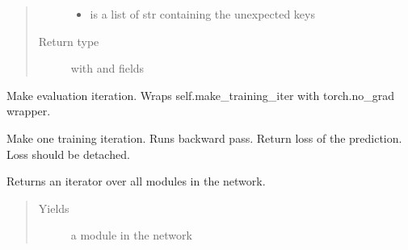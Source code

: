 \documentclass[letterpaper,10pt,english]{sphinxmanual}
\begin{document}
\begin{fulllineitems}
\begin{fulllineitems}
\begin{quote}
\begin{description}
\begin{itemize}
\item {} 
 is a list of str containing the unexpected keys

\end{itemize}


\item[{Return type}] \leavevmode
{} with  and  fields

\end{description}\end{quote}

\end{fulllineitems}


\begin{fulllineitems}
\label{\detokenize{api/dynamics:geology.metamodelling.dynamics.LatentSpaceDynamics.make_evaluation_iter}}
Make evaluation iteration.
Wraps self.make\_training\_iter with torch.no\_grad wrapper.

\end{fulllineitems}


\begin{fulllineitems}
\label{\detokenize{api/dynamics:geology.metamodelling.dynamics.LatentSpaceDynamics.make_training_iter}}
Make one training iteration. Runs backward pass. Return loss of the prediction.
Loss should be detached.

\end{fulllineitems}


\begin{fulllineitems}
\label{\detokenize{api/dynamics:geology.metamodelling.dynamics.LatentSpaceDynamics.modules}}
Returns an iterator over all modules in the network.
\begin{quote}\begin{description}
\item[{Yields}] \leavevmode
{} \textendash{} a module in the network


\end{description}
\end{quote}
\end{fulllineitems}
\end{fulllineitems}
\end{document}

